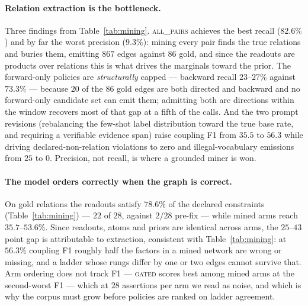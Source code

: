 \documentclass{article} %
\begin{document}
\paragraph{Relation extraction is the bottleneck.} Three findings from Table~\ref{tab:mining}.
\textsc{all\_pairs} achieves the best recall ($82.6\%$) and by far the worst precision
($9.3\%$): mining every pair finds the true relations and buries them, emitting $867$ edges against
$86$ gold, and since the readouts are products over relations this is what drives the marginals
toward the prior. The forward-only policies are \emph{structurally} capped --- backward recall
$23$--$27\%$ against $73.3\%$ --- because $20$ of the $86$ gold edges are both directed and
backward and no forward-only candidate set can emit them; admitting both arc directions within the
window recovers most of that gap at a fifth of the calls. And the two prompt revisions
(rebalancing the few-shot label distribution toward the true base rate, and requiring a verifiable
evidence span) raise coupling F1 from $35.5$ to $56.3$ while driving declared-non-relation
violations to zero and illegal-vocabulary emissions from $25$ to $0$. Precision, not recall, is
where a grounded miner is won.

\paragraph{The model orders correctly when the graph is correct.} On gold relations the readouts
satisfy $78.6\%$ of the declared constraints (Table~\ref{tab:mining}) --- $22$ of $28$, against
$2/28$ pre-fix --- while mined arms reach $35.7$--$53.6\%$. Since readouts, atoms and priors are
identical across arms, the $25$--$43$ point gap is attributable to extraction, consistent with
Table~\ref{tab:mining}: at $56.3\%$ coupling F1 roughly half the factors in a mined network are
wrong or missing, and a ladder whose rungs differ by one or two edges cannot survive that. Arm
ordering does not track F1 --- \textsc{gated} scores best among mined arms at the second-worst F1
--- which at $28$ assertions per arm we read as noise, and which is why the corpus must grow before
policies are ranked on ladder agreement.
\end{document}
